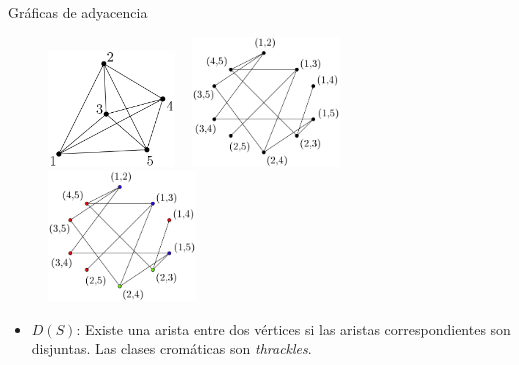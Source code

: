 %
%
\begin{frame}{Gráficas de adyacencia}
\begin{figure}
	\centering
	\includegraphics[width=0.3\textwidth]{images/K5}%
	~\vrule
	\includegraphics[width=0.35\textwidth]{images/grafica4k5}%
	~\vrule
	\includegraphics[width=0.35\textwidth]{images/grafica4k5_colored}%
\end{figure}

\begin{itemize}
\item $D(S)$: Existe una arista entre dos vértices si las aristas correspondientes son disjuntas. Las clases cromáticas son \emph{thrackles}.
\end{itemize}
\end{frame}

